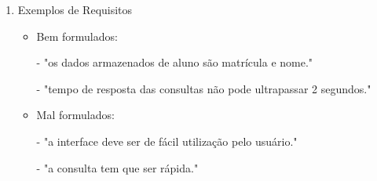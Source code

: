 \documentclass[
	12pt, %
]{fphw}
\begin{document}
\begin{doublespace}
\begin{enumerate}
\begin{itemize}
    \end{itemize}

    \item Exemplos de Requisitos
    
    \begin{itemize}

        \item Bem formulados:

        - "os dados armazenados de aluno são matrícula e nome."

        - "tempo de resposta das consultas não pode ultrapassar 2 segundos."

        \item Mal formulados:
        
        - "a interface deve ser de fácil utilização pelo usuário."
        
        - "a consulta tem que ser rápida."

    \end{itemize}

\end{enumerate}

\end{doublespace}
\end{document}
